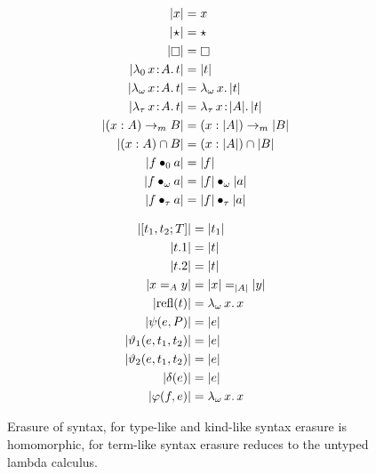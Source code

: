 

\begin{figure}
    \centering
    \begin{minipage}{0.5\textwidth}
        \begin{align*}
            |x| &= x \\
            |\!\star\!| &= \star \\
            |\kind| &= \kind \\
            |\abs{\lambda_0}{x}{A}{t}| &= |t| \\
            |\abs{\lambda_\omega}{x}{A}{t}| &= \absu{\lambda_\omega}{x}{|t|} \\
            |\abs{\lambda_\tau}{x}{A}{t}| &= \abs{\lambda_\tau}{x}{|A|}{|t|} \\
            |(x:A) \to_m B| &= (x:|A|) \to_m |B| \\
            |(x:A) \cap B| &= (x:|A|) \cap |B| \\
            |\app{f}{0}{a}| &= |f| \\
            |\app{f}{\omega}{a}| &= \app{|f|}{\omega}{|a|} \\
            |\app{f}{\tau}{a}| &= \app{|f|}{\tau}{|a|}
        \end{align*}
    \end{minipage}%
    \begin{minipage}{0.5\textwidth}
        \begin{align*}
            |[t_1, t_2; T]| &= |t_1| \\
            |t.1| &= |t| \\
            |t.2| &= |t| \\
            |x =_A y| &= |x| =_{|A|} |y| \\
            |\text{refl}(t)| &= {\lambda_\omega}\, x.\, x \\
            |\psi(e, P)| &= |e| \\
            |\vartheta_1(e, t_1, t_2)| &= |e| \\
            |\vartheta_2(e, t_1, t_2)| &= |e| \\
            |\delta(e)| &= |e| \\
            |\varphi(f,e)| &= {\lambda_\omega}\, x.\, x
        \end{align*}
    \end{minipage}
    \caption{Erasure of syntax, for type-like and kind-like syntax erasure is homomorphic, for term-like syntax erasure reduces to the untyped lambda calculus.}
\end{figure}
